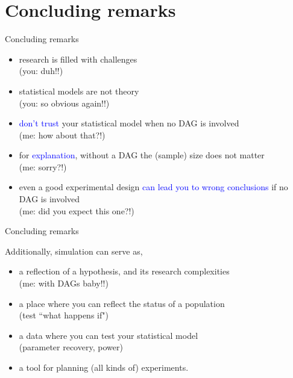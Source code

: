 \section{Concluding remarks}
%
\begin{frame}[negative]
	\sectionpage
\end{frame}
%
%
\begin{lhframe}[rhgraphic={\texttt{[image: think1.jpg]}}]
	{Concluding remarks}
	
	\begin{itemize}
		\item research is filled with challenges \\
		{\small (you: duh!!) }
		\item statistical models are not theory \\
		{\small (you: so obvious again!!) }
		\item \textcolor{blue}{don't trust} your statistical model when no DAG is involved \\
		{\small (me: how about that?!) }
		\item for \textcolor{blue}{explanation}, without a DAG the (sample) size does not matter \\
		{\small (me: sorry?!) }
		\item even a good experimental design \textcolor{blue}{can lead you to wrong conclusions} if no DAG is involved \\
		{\small (me: did you expect this one?!)}
	\end{itemize} 
\end{lhframe}
%
%
\begin{lhframe}[rhgraphic={\texttt{[image: think2.jpg]}}]
	{Concluding remarks}
	
	Additionally, simulation can serve as,
	\begin{itemize}
		\item a reflection of a hypothesis, and its research complexities\\
		{\small (me: with DAGs baby!!)}
		\item a place where you can reflect the status of a population \\
		{\small (test ``what happens if") }
		\item a data where you can test your statistical model \\
		{\small (parameter recovery, power) }
		\item a tool for planning (all kinds of) experiments.
	\end{itemize} 
\end{lhframe}
%
%